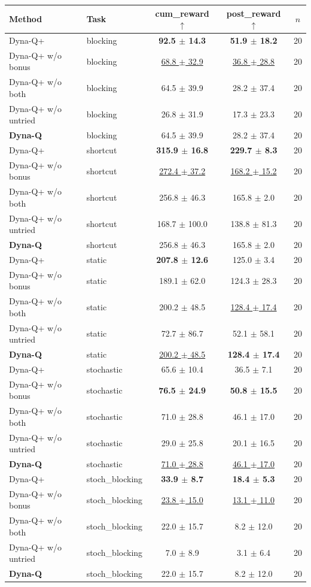 \begin{tabular}{llccc}
\toprule
Method & Task & cum\_reward $\uparrow$ & post\_reward $\uparrow$ & $n$ \\
\midrule
Dyna-Q+ & blocking & \textbf{92.5 $\pm$ 14.3} & \textbf{51.9 $\pm$ 18.2} & 20 \\
Dyna-Q+ w/o bonus & blocking & \underline{68.8 $\pm$ 32.9} & \underline{36.8 $\pm$ 28.8} & 20 \\
Dyna-Q+ w/o both & blocking & 64.5 $\pm$ 39.9 & 28.2 $\pm$ 37.4 & 20 \\
Dyna-Q+ w/o untried & blocking & 26.8 $\pm$ 31.9 & 17.3 $\pm$ 23.3 & 20 \\
\textbf{Dyna-Q} & blocking & 64.5 $\pm$ 39.9 & 28.2 $\pm$ 37.4 & 20 \\
\midrule
Dyna-Q+ & shortcut & \textbf{315.9 $\pm$ 16.8} & \textbf{229.7 $\pm$ 8.3} & 20 \\
Dyna-Q+ w/o bonus & shortcut & \underline{272.4 $\pm$ 37.2} & \underline{168.2 $\pm$ 15.2} & 20 \\
Dyna-Q+ w/o both & shortcut & 256.8 $\pm$ 46.3 & 165.8 $\pm$ 2.0 & 20 \\
Dyna-Q+ w/o untried & shortcut & 168.7 $\pm$ 100.0 & 138.8 $\pm$ 81.3 & 20 \\
\textbf{Dyna-Q} & shortcut & 256.8 $\pm$ 46.3 & 165.8 $\pm$ 2.0 & 20 \\
\midrule
Dyna-Q+ & static & \textbf{207.8 $\pm$ 12.6} & 125.0 $\pm$ 3.4 & 20 \\
Dyna-Q+ w/o bonus & static & 189.1 $\pm$ 62.0 & 124.3 $\pm$ 28.3 & 20 \\
Dyna-Q+ w/o both & static & 200.2 $\pm$ 48.5 & \underline{128.4 $\pm$ 17.4} & 20 \\
Dyna-Q+ w/o untried & static & 72.7 $\pm$ 86.7 & 52.1 $\pm$ 58.1 & 20 \\
\textbf{Dyna-Q} & static & \underline{200.2 $\pm$ 48.5} & \textbf{128.4 $\pm$ 17.4} & 20 \\
\midrule
Dyna-Q+ & stochastic & 65.6 $\pm$ 10.4 & 36.5 $\pm$ 7.1 & 20 \\
Dyna-Q+ w/o bonus & stochastic & \textbf{76.5 $\pm$ 24.9} & \textbf{50.8 $\pm$ 15.5} & 20 \\
Dyna-Q+ w/o both & stochastic & 71.0 $\pm$ 28.8 & 46.1 $\pm$ 17.0 & 20 \\
Dyna-Q+ w/o untried & stochastic & 29.0 $\pm$ 25.8 & 20.1 $\pm$ 16.5 & 20 \\
\textbf{Dyna-Q} & stochastic & \underline{71.0 $\pm$ 28.8} & \underline{46.1 $\pm$ 17.0} & 20 \\
\midrule
Dyna-Q+ & stoch\_blocking & \textbf{33.9 $\pm$ 8.7} & \textbf{18.4 $\pm$ 5.3} & 20 \\
Dyna-Q+ w/o bonus & stoch\_blocking & \underline{23.8 $\pm$ 15.0} & \underline{13.1 $\pm$ 11.0} & 20 \\
Dyna-Q+ w/o both & stoch\_blocking & 22.0 $\pm$ 15.7 & 8.2 $\pm$ 12.0 & 20 \\
Dyna-Q+ w/o untried & stoch\_blocking & 7.0 $\pm$ 8.9 & 3.1 $\pm$ 6.4 & 20 \\
\textbf{Dyna-Q} & stoch\_blocking & 22.0 $\pm$ 15.7 & 8.2 $\pm$ 12.0 & 20 \\
\bottomrule
\end{tabular}
